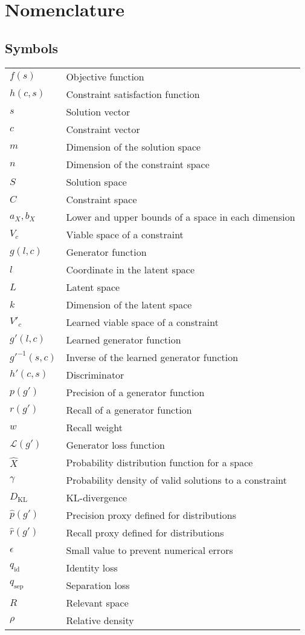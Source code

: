 \documentclass[../main.tex]{subfiles}
\begin{document}
\chapter*{Nomenclature}

\section*{Symbols}

\begin{longtable}[l]{ l l }
    $f(s)$ & Objective function \\ 
    $h(c, s)$ & Constraint satisfaction function \\  
    $s$ & Solution vector \\
    $c$ & Constraint vector \\
    $m$ & Dimension of the solution space \\
    $n$ & Dimension of the constraint space \\
    $S$ & Solution space \\
    $C$ & Constraint space \\
    $a_X, b_X$ & Lower and upper bounds of a space in each dimension \\
    $V_c$ & Viable space of a constraint \\
    $g(l, c)$ & Generator function \\
    $l$ & Coordinate in the latent space \\
    $L$ & Latent space \\
    $k$ & Dimension of the latent space \\
    $V'_c$ & Learned viable space of a constraint \\
    $g'(l, c)$ & Learned generator function \\
    $g'^{-1}(s, c)$ & Inverse of the learned generator function \\
    $h'(c,s)$ & Discriminator \\
    $p(g')$ & Precision of a generator function \\
    $r(g')$ & Recall of a generator function \\
    $w$ & Recall weight \\
    $\mathcal{L}(g')$ & Generator loss function \\
    $\hat{X}$ & Probability distribution function for a space \\
    $\gamma$ & Probability density of valid solutions to a constraint \\
    $D_\text{KL}$ & KL-divergence \\
    $\hat{p}(g')$ & Precision proxy defined for distributions \\
    $\hat{r}(g')$ & Recall proxy defined for distributions \\
    $\epsilon$ & Small value to prevent numerical errors \\
    $q_\text{id}$ & Identity loss \\
    $q_\text{sep}$ & Separation loss \\
    $R$ & Relevant space \\
    $\rho$ & Relative density \\
\end{longtable}
\end{document}
